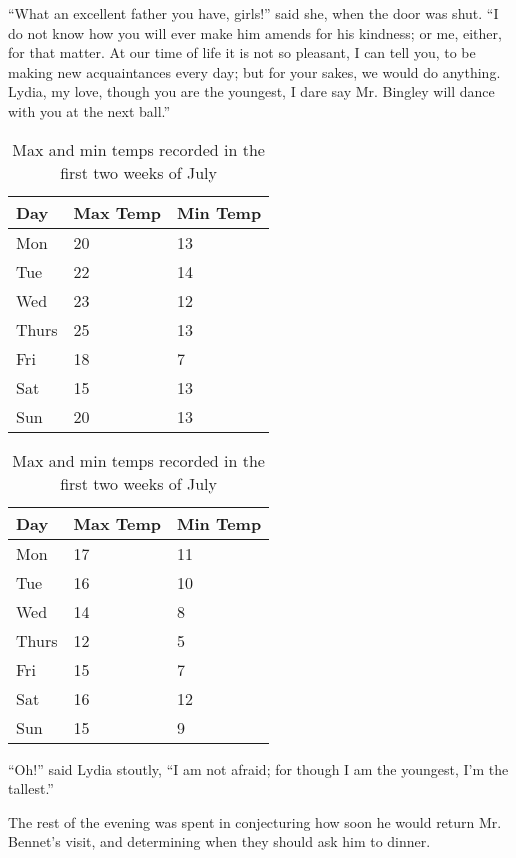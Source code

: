       “What an excellent father you have, girls!” said she, when the
      door was shut. “I do not know how you will ever make him amends
      for his kindness; or me, either, for that matter. At our time of
      life it is not so pleasant, I can tell you, to be making new
      acquaintances every day; but for your sakes, we would do
      anything. Lydia, my love, though you are the youngest, I dare
      say Mr. Bingley will dance with you at the next ball.”
	  \begin{table}[h]
	  	\begin{subtable}[h]{0.45\textwidth}
	  		\centering
	  		\begin{tabular}{l | l | l}
	  			Day & Max Temp & Min Temp \\
	  			\hline \hline
	  			Mon & 20 & 13\\
	  			Tue & 22 & 14\\
	  			Wed & 23 & 12\\
	  			Thurs & 25 & 13\\
	  			Fri & 18 & 7\\
	  			Sat & 15 & 13\\
	  			Sun & 20 & 13
	  		\end{tabular}
	  		\caption{First Week}
	  		\label{tab:week1}
	  	\end{subtable}
	  	\hfill
	  	\begin{subtable}[h]{0.45\textwidth}
	  		\centering
	  		\begin{tabular}{l | l | l}
	  			Day & Max Temp & Min Temp \\
	  			\hline \hline
	  			Mon & 17 & 11\\
	  			Tue & 16 & 10\\
	  			Wed & 14 & 8\\
	  			Thurs & 12 & 5\\
	  			Fri & 15 & 7\\
	  			Sat & 16 & 12\\
	  			Sun & 15 & 9
	  		\end{tabular}
	  		\caption{Second Week}
	  		\label{tab:week2}
	  	\end{subtable}
	  	\caption{Max and min temps recorded in the first two weeks of July}
	  	\label{tab:temps}
	  \end{table}
      “Oh!” said Lydia stoutly, “I am not afraid; for though I am the
      youngest, I’m the tallest.”

      The rest of the evening was spent in conjecturing how soon he
      would return Mr. Bennet’s visit, and determining when they should
      ask him to dinner.